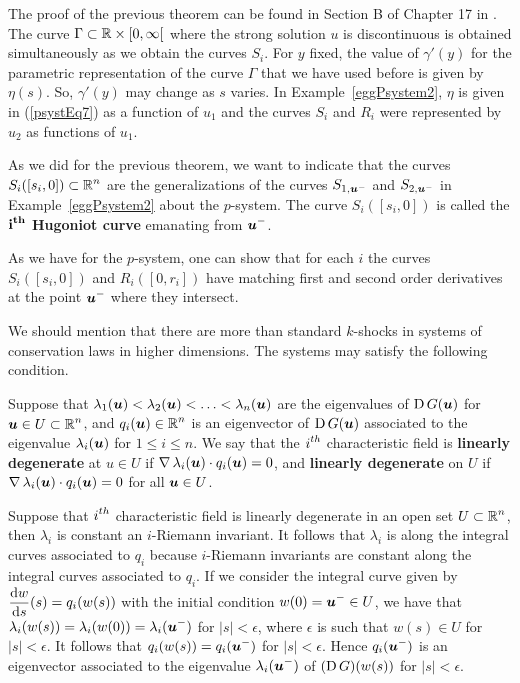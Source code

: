 The proof of the previous theorem can be found in Section B of
Chapter 17 in \cite{Smo}.  The curve $\Gamma \subset \mathbb{R}\times [0,\infty[$
where the strong solution $u$ is discontinuous is obtained
simultaneously as we obtain the curves $S_i$.  For $y$ fixed, the value of
$\gamma'(y)$ for the parametric representation of the curve $\Gamma$
that we have used before is given by $\eta(s)$.  So, $\gamma'(y)$
may change as $s$ varies.
In Example~\ref{eggPsystem2}, $\eta$ is given in
(\ref{psystEq7}) as a function of $u_1$ and the curves $S_i$ and $R_i$
were represented by $u_2$ as functions of $u_1$.

As we did for the previous theorem, we want to indicate that the
curves $\displaystyle S_i([s_i,0]) \subset \mathbb{R}^n$ are the generalizations of the
curves $S_{1,{\bm{u}}^-}$ and $S_{2,{\bm{u}}^-}$ in
Example~\ref{eggPsystem2} about the $p$-system.
The curve $S_i([s_i,0])$ is called the
{\bfseries $\displaystyle \mathbf{i^{th}}$ Hugoniot curve} emanating from
$\displaystyle {\bm{u}}^-$.

As we have for the $p$-system, one can show that for each $i$ the
curves $S_i([s_i,0])$ and $R_i([0,r_i])$ have matching first and second
order derivatives at the point $\displaystyle {\bm{u}}^-$ where they intersect.

We should mention that there are more than standard $k$-shocks in
systems of conservation laws in higher dimensions.   The systems may
satisfy the following condition.

\begin{defn}
Suppose that
$\lambda_1({\bm{u}}) < \lambda_2({\bm{u}}) < \ldots < \lambda_n({\bm{u}})$
are the eigenvalues of $\operatorname{D} G({\bm{u}})$ for
$\displaystyle {\bm{u}} \in U \subset \mathbb{R}^n$,
and $\displaystyle q_i({\bm{u}}) \in \mathbb{R}^n$ is an eigenvector of
$\operatorname{D} G({\bm{u}})$
associated to the eigenvalue $\lambda_i({\bm{u}})$ for $1 \leq i \leq n$.
We say that the $\displaystyle i^{th}$ characteristic field is
{\bfseries linearly degenerate} at
$u \in U$ if $\operatorname{\nabla} \lambda_i({\bm{u}}) \cdot q_i({\bm{u}}) = 0$,
and {\bfseries linearly degenerate} on $U$ if
$\operatorname{\nabla} \lambda_i({\bm{u}}) \cdot q_i({\bm{u}}) = 0$ for all ${\bm{u}} \in U$.
\end{defn}

Suppose that $\displaystyle i^{th}$ characteristic field is linearly
degenerate in an open set $\displaystyle U \subset \mathbb{R}^n$, then
$\lambda_i$ is constant an $i$-Riemann invariant.  It follows that
$\lambda_i$ is along the integral curves associated to $q_i$ because
$i$-Riemann invariants are constant along the integral curves
associated to $q_i$.  If we consider the integral curve given by
$\displaystyle \frac{\mathrm{d}w}{\mathrm{d}{s}}(s) = q_i(w(s))$ with the
initial condition $\displaystyle w(0) = {\bm{u}}^- \in U$, we have that
$\displaystyle \lambda_i(w(s)) = \lambda_i(w(0)) = \lambda_i({\bm{u}}^-)$
for $|s| < \epsilon$, where $\epsilon$ is such that $w(s) \in U$ for
$|s| < \epsilon$.
It follows that $\displaystyle q_i(w(s)) = q_i({\bm{u}}^-)$ for
$|s| < \epsilon$.  Hence $\displaystyle q_i({\bm{u}}^-)$ is an eigenvector
associated to the eigenvalue $\displaystyle \lambda_i({\bm{u}}^-)$ of
$(\operatorname{D} G)(w(s))$ for $|s| < \epsilon$.

